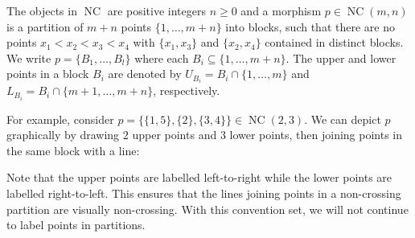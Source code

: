\documentclass[12pt, a4paper]{amsart}
\def\NC{\operatorname{NC}}
\theoremstyle{definition}
\theoremstyle{remark}
\numberwithin{equation}{section}
\begin{document}
The objects in $\NC$ are positive integers $n\geq 0$ and a morphism $p\in\NC(m,n)$ is a partition of $m+n$ points $\{1,\dots,m+n\}$ into blocks, such that there are no points $x_1<x_2<x_3<x_4$ with $\{x_1,x_3\}$ and $\{x_2,x_4\}$ contained in distinct blocks. We write $p = \{B_1,\dots,B_l\}$ where each $B_i \subseteq \{1,\dots,m+n\}$. The upper and lower points in a block $B_i$ are denoted by $U_{B_i} = B_i\cap\{1,\dots,m\}$ and $L_{B_i} = B_i\cap\{m+1,\dots,m+n\}$, respectively.

For example, consider $p = \{\{1,5\},\{2\},\{3,4\}\} \in \NC(2,3)$. We can depict $p$ graphically by drawing $2$ upper points and $3$ lower points, then joining points in the same block with a line:
\begin{center}
\end{center}
Note that the upper points are labelled left-to-right while the lower points are labelled right-to-left. This ensures that the lines joining points in a non-crossing partition are visually non-crossing. With this convention set, we will not continue to label points in partitions.
\end{document}
